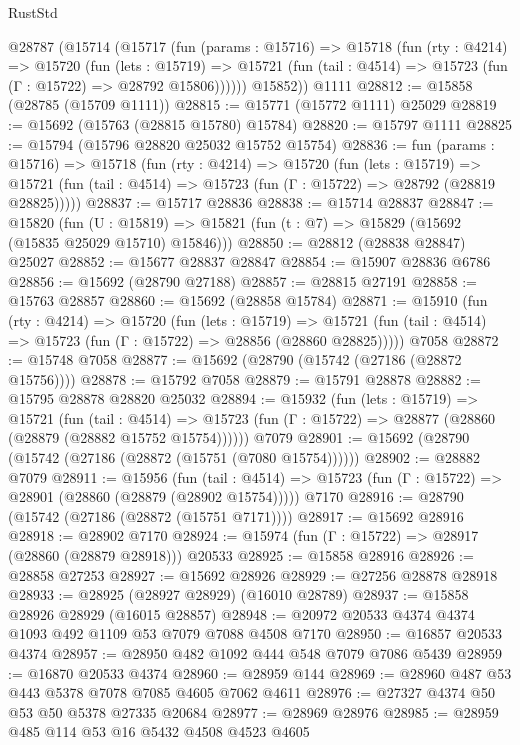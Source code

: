 \begin{lexlean}{RustStd}
\begin{coremodule}
    @28787
      (@15714
        (@15717
          (fun (params : @15716) =>
          @15718
            (fun (rty : @4214) =>
            @15720
              (fun (lets : @15719) =>
              @15721 (fun (tail : @4514) => @15723 (fun (Γ : @15722) => @28792 @15806))))))
        @15852))
    @1111
@28812 := @15858 (@28785 (@15709 @1111))
@28815 := @15771 (@15772 @1111) @25029
@28819 := @15692 (@15763 (@28815 @15780) @15784)
@28820 := @15797 @1111
@28825 := @15794 (@15796 @28820 @25032 @15752 @15754)
@28836 := fun (params : @15716) =>
  @15718
    (fun (rty : @4214) =>
    @15720
      (fun (lets : @15719) =>
      @15721 (fun (tail : @4514) => @15723 (fun (Γ : @15722) => @28792 (@28819 @28825)))))
@28837 := @15717 @28836
@28838 := @15714 @28837
@28847 := @15820
    (fun (U : @15819) => @15821 (fun (t : @7) => @15829 (@15692 (@15835 @25029 @15710) @15846)))
@28850 := @28812 (@28838 @28847) @25027
@28852 := @15677 @28837 @28847
@28854 := @15907 @28836 @6786
@28856 := @15692 (@28790 @27188)
@28857 := @28815 @27191
@28858 := @15763 @28857
@28860 := @15692 (@28858 @15784)
@28871 := @15910
    (fun (rty : @4214) =>
    @15720
      (fun (lets : @15719) =>
      @15721 (fun (tail : @4514) => @15723 (fun (Γ : @15722) => @28856 (@28860 @28825)))))
    @7058
@28872 := @15748 @7058
@28877 := @15692 (@28790 (@15742 (@27186 (@28872 @15756))))
@28878 := @15792 @7058
@28879 := @15791 @28878
@28882 := @15795 @28878 @28820 @25032
@28894 := @15932
    (fun (lets : @15719) =>
    @15721
      (fun (tail : @4514) =>
      @15723 (fun (Γ : @15722) => @28877 (@28860 (@28879 (@28882 @15752 @15754))))))
    @7079
@28901 := @15692 (@28790 (@15742 (@27186 (@28872 (@15751 (@7080 @15754))))))
@28902 := @28882 @7079
@28911 := @15956
    (fun (tail : @4514) => @15723 (fun (Γ : @15722) => @28901 (@28860 (@28879 (@28902 @15754)))))
    @7170
@28916 := @28790 (@15742 (@27186 (@28872 (@15751 @7171))))
@28917 := @15692 @28916
@28918 := @28902 @7170
@28924 := @15974 (fun (Γ : @15722) => @28917 (@28860 (@28879 @28918))) @20533
@28925 := @15858 @28916
@28926 := @28858 @27253
@28927 := @15692 @28926
@28929 := @27256 @28878 @28918
@28933 := @28925 (@28927 @28929) (@16010 @28789)
@28937 := @15858 @28926 @28929 (@16015 @28857)
@28948 := @20972 @20533 @4374 @4374 @1093 @492 @1109 @53 @7079 @7088 @4508 @7170
@28950 := @16857 @20533 @4374
@28957 := @28950 @482 @1092 @444 @548 @7079 @7086 @5439
@28959 := @16870 @20533 @4374
@28960 := @28959 @144
@28969 := @28960 @487 @53 @443 @5378 @7078 @7085 @4605 @7062 @4611
@28976 := @27327 @4374 @50 @53 @50 @5378 @27335 @20684
@28977 := @28969 @28976
@28985 := @28959 @485 @114 @53 @16 @5432 @4508 @4523 @4605

\end{coremodule}
\end{lexlean}
